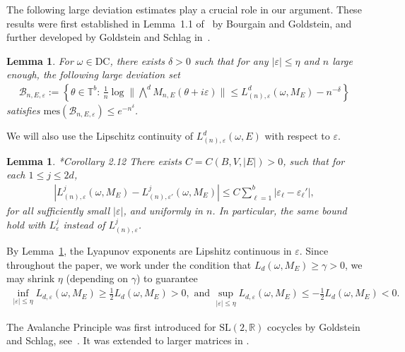 \documentclass[11pt]{amsart}
\newtheorem{lemma}[theorem]{Lemma}
\newcommand{\R}{\mathbb R}
\def\tor{\mathbb{T}}
\begin{document}
The following large deviation estimates play a crucial role in our argument. 
These results were first established in Lemma~1.1 of~\cite{BG} by Bourgain and Goldstein, and further developed  by Goldstein and Schlag in~\cites{GS1,GS2}.

\begin{lemma}\label{lem:LDTsig}
For $\omega\in \mathrm{DC}$, there exists $\delta>0$ such that for any $|\varepsilon|\leq \eta$ and $n$ large enough, the following large deviation set 
\begin{align}\label{def:badnE}
\mathcal{B}_{n,E,\varepsilon}:=\left\{\theta\in\tor^b:\, \frac{1}{n}\log \|\textstyle{\bigwedge^d}  M_{n,E}(\theta+i\varepsilon)\|\leq {L}_{(n),\varepsilon}^d(\omega,M_E)-n^{-\delta}\right\}
\end{align}
satisfies $\mathrm{mes}(\mathcal{B}_{n,E,\varepsilon})\leq e^{-n^\delta}$. 
\end{lemma}

We will also use the Lipschitz continuity of $L^{d}_{(n),\varepsilon}(\omega,E)$ with respect
to $\varepsilon$.
\begin{lemma}\label{lem:Lip_eps}\cite{GSV}*{Corollary 2.12}
There exists $C=C(B,V,|E|)>0$, such that for each $1\leq j\leq 2d$,
    \begin{align}\label{eq:Lip_eps}
        |L^j_{(n),\varepsilon}(\omega,M_E)-L^j_{(n),\varepsilon'}(\omega,M_E)|\leq C\sum_{\ell=1}^b |\varepsilon_\ell-\varepsilon_\ell'|,
    \end{align}
   for all sufficiently small $|\varepsilon|$, and  
    uniformly in $n$. In particular,  the same bound hold with $L^j_{\varepsilon}$ instead of $L^j_{(n),\varepsilon}$.
\end{lemma}

By Lemma~\ref{lem:Lip_eps}, the Lyapunov exponents are Lipshitz continuous in $\varepsilon$. Since throughout the paper, we work under the condition that $L_d(\omega,M_E)\geq \gamma>0$, we may shrink $\eta$ (depending on $\gamma$) to guarantee 
\begin{align}\label{eq:L_d>0_varepsilon}
\inf_{|\varepsilon|\leq \eta} L_{d,\varepsilon}(\omega, M_E)\geq \frac{1}{2}L_d(\omega,M_E)>0, \text{\ \  and \ \ } \sup_{|\varepsilon|\leq \eta}L_{d,\varepsilon}(\omega,M_E)\leq -\frac{1}{2}L_d(\omega,M_E)<0.
\end{align}
 
The Avalanche Principle was first introduced for $\mathrm{SL}(2,\R)$ cocycles by Goldstein and Schlag, see~\cite{GS1}.
It was extended to larger matrices in \cites{S1,DK}.
\end{document}
